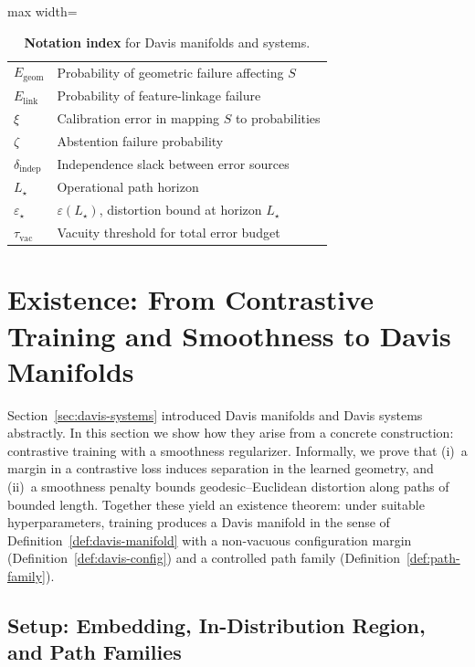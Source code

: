 \documentclass[11pt]{article}
\begin{document}
\begin{samepage}
\begin{table}[t]
\begin{adjustbox}{max width=\linewidth}
\begin{tabular}{ll}
        $E_{\text{geom}}$ & Probability of geometric failure affecting $S$ \\
        $E_{\text{link}}$ & Probability of feature-linkage failure \\
        $\xi$ & Calibration error in mapping $S$ to probabilities \\
        $\zeta$ & Abstention failure probability \\
        $\delta_{\text{indep}}$ & Independence slack between error sources \\
        $L_\star$ & Operational path horizon \\
        $\varepsilon_\star$ & $\varepsilon(L_\star)$, distortion bound at horizon $L_\star$ \\
        $\tau_{\text{vac}}$ & Vacuity threshold for total error budget \\
        \bottomrule
    \end{tabular}
    \end{adjustbox}
    \caption{\textbf{Notation index} for Davis manifolds and systems.}
    \label{tab:notation}
\end{table}
\end{samepage}

\section{Existence: From Contrastive Training and Smoothness to Davis Manifolds}
\label{sec:existence}

Section~\ref{sec:davis-systems} introduced Davis manifolds and Davis systems abstractly. In this
section we show how they arise from a concrete construction: contrastive training with a smoothness
regularizer. Informally, we prove that
(i)~a margin in a contrastive loss induces separation in the learned geometry, and
(ii)~a smoothness penalty bounds geodesic--Euclidean distortion along paths of bounded length.
Together these yield an existence theorem: under suitable hyperparameters, training produces a
Davis manifold in the sense of Definition~\ref{def:davis-manifold} with a non-vacuous configuration
margin (Definition~\ref{def:davis-config}) and a controlled path family
(Definition~\ref{def:path-family}).

\subsection{Setup: Embedding, In-Distribution Region, and Path Families}
\label{subsec:existence-setup}
\end{document}
